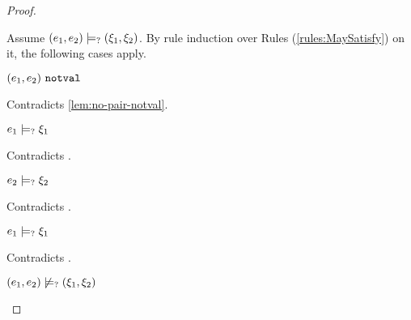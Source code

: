 \begin{proof}
\begin{byCases}
\begin{byCases}
\begin{byCases}
\begin{pfsteps*}
            \end{pfsteps*}
            Assume $(e_1 , e_2) \models_{?} (\xi_1 , \xi_2)$. By rule induction over Rules (\ref{rules:MaySatisfy}) on it, the following cases apply.
            \begin{byCases}
            \item[\text{(\ref{rule:CMSNotVal})}]
                \begin{pfsteps*}
                \item $(e_1 , e_2) ~\mathtt{notval}$ 
                \end{pfsteps*}
                Contradicts \autoref{lem:no-pair-notval}.
            \item[\text{(\ref{rule:CMSPair1})}]
                \begin{pfsteps*}
                \item $e_1 \models_{?} \xi_1$ 
                \end{pfsteps*}
                Contradicts .
            \item[\text{(\ref{rule:CMSPair2})}]
                \begin{pfsteps*}
                \item $e_2 \models_{?} \xi_2$ 
                \end{pfsteps*}
                Contradicts .
            \item[\text{(\ref{rule:CMSPair3})}]
                \begin{pfsteps*}
                \item $e_1 \models_{?} \xi_1$ 
                \end{pfsteps*}
                Contradicts .
            \end{byCases}
            \begin{pfsteps*}
            \item $(e_1 , e_2) \not\models_{?} (\xi_1 , \xi_2)$ 
            \end{pfsteps*}
            

\end{byCases}
\end{byCases}
\end{byCases}
\end{proof}
